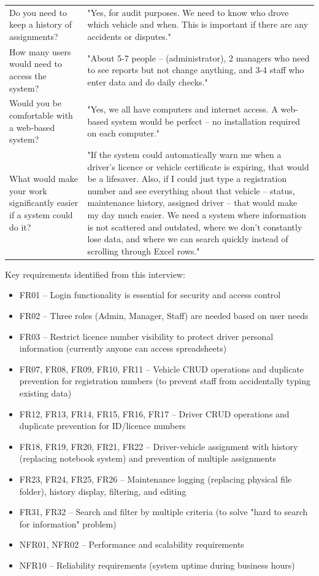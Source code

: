 \documentclass[11pt,a4paper]{article}
\begin{document}
\begin{longtable}{@{}p{6.5cm}p{7.8cm}@{}}
Do you need to keep a history of assignments? & "Yes, for audit purposes. We need to know who drove which vehicle and when. This is important if there are any accidents or disputes." \\
How many users would need to access the system? & "About 5-7 people -- (administrator), 2 managers who need to see reports but not change anything, and 3-4 staff who enter data and do daily checks." \\
Would you be comfortable with a web-based system? & "Yes, we all have computers and internet access. A web-based system would be perfect -- no installation required on each computer." \\
What would make your work significantly easier if a system could do it? & "If the system could automatically warn me when a driver's licence or vehicle certificate is expiring, that would be a lifesaver. Also, if I could just type a registration number and see everything about that vehicle -- status, maintenance history, assigned driver -- that would make my day much easier. We need a system where information is not scattered and outdated, where we don't constantly lose data, and where we can search quickly instead of scrolling through Excel rows." \\
\bottomrule
\end{longtable}

Key requirements identified from this interview:
\begin{itemize}
  \item FR01 -- Login functionality is essential for security and access control
  \item FR02 -- Three roles (Admin, Manager, Staff) are needed based on user needs
  \item FR03 -- Restrict licence number visibility to protect driver personal information (currently anyone can access spreadsheets)
  \item FR07, FR08, FR09, FR10, FR11 -- Vehicle CRUD operations and duplicate prevention for registration numbers (to prevent staff from accidentally typing existing data)
  \item FR12, FR13, FR14, FR15, FR16, FR17 -- Driver CRUD operations and duplicate prevention for ID/licence numbers
  \item FR18, FR19, FR20, FR21, FR22 -- Driver-vehicle assignment with history (replacing notebook system) and prevention of multiple assignments
  \item FR23, FR24, FR25, FR26 -- Maintenance logging (replacing physical file folder), history display, filtering, and editing
  \item FR31, FR32 -- Search and filter by multiple criteria (to solve "hard to search for information" problem)
  \item NFR01, NFR02 -- Performance and scalability requirements
  \item NFR10 -- Reliability requirements (system uptime during business hours)
\end{itemize}
\end{document}
